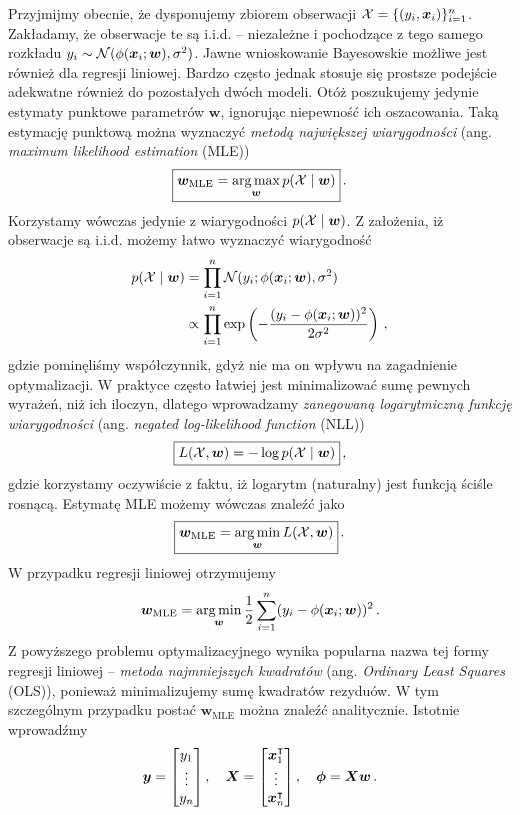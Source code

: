 \documentclass{myclass}
\begin{document}
Przyjmijmy obecnie, że dysponujemy zbiorem obserwacji \(\mathcal{X} = \{(y_i, \bm{x}_i)\}_{i=1}^n\).
Zakładamy, że obserwacje te są i.i.d. -- niezależne i pochodzące z tego samego rozkładu \(y_i \sim
\mathcal{N}(\phi(\bm{x}_i; \bm{w}), \sigma^2)\). Jawne wnioskowanie Bayesowskie możliwe jest również dla
regresji liniowej. Bardzo często jednak stosuje się prostsze podejście adekwatne również do
pozostałych dwóch modeli. Otóż poszukujemy jedynie estymaty punktowe parametrów \(\bm{w}\),
ignorując niepewność ich oszacowania. Taką estymację punktową można wyznaczyć \emph{metodą
największej wiarygodności} (ang. \emph{maximum likelihood estimation} (MLE))
\[
\boxed{
    \bm{w}_\text{MLE} = \operatorname*{arg\,max}_{\bm{w}} p(\mathcal{X} \mid \bm{w})
}\,.
\]
Korzystamy wówczas jedynie z wiarygodności \(p(\mathcal{X} \mid \bm{w})\). Z założenia, iż obserwacje są
i.i.d. możemy łatwo wyznaczyć wiarygodność
\[
\begin{split}
    p(\mathcal{X} \mid \bm{w}) &= \prod_{i=1}^n \mathcal{N}(y_i; \phi(\bm{x}_i; \bm{w}), \sigma^2) \\
                          &\propto \prod_{i=1}^n \exp\left(-\frac{(y_i - \phi(\bm{x}_i; \bm{w}))^2}{2\sigma^2}\right)\,,
\end{split}
\]
gdzie pominęliśmy współczynnik, gdyż nie ma on wpływu na zagadnienie optymalizacji. W praktyce
często łatwiej jest minimalizować sumę pewnych wyrażeń, niż ich iloczyn, dlatego wprowadzamy
\emph{zanegowaną logarytmiczną funkcję wiarygodności} (ang. \emph{negated log-likelihood function}
(NLL))
\[
\boxed{
    L(\mathcal{X}, \bm{w}) = - \log p(\mathcal{X} \mid \bm{w})
}\,,
\]
gdzie korzystamy oczywiście z faktu, iż logarytm (naturalny) jest funkcją ściśle rosnącą. Estymatę
MLE możemy wówczas znaleźć jako
\[
\boxed{
    \bm{w}_\text{MLE} = \operatorname*{arg\,min}_{\bm{w}} L(\mathcal{X}, \bm{w})
}\,.
\]
W przypadku regresji liniowej otrzymujemy
\[
    \bm{w}_\text{MLE} = \operatorname*{arg\,min}_{\bm{w}} \frac{1}{2}\sum_{i=1}^n (y_i - \phi(\bm{x}_i; \bm{w}))^2\,.
\]
Z powyższego problemu optymalizacyjnego wynika popularna nazwa tej formy regresji liniowej --
\emph{metoda najmniejszych kwadratów} (ang. \emph{Ordinary Least Squares} (OLS)), ponieważ
minimalizujemy sumę kwadratów rezyduów. W tym szczególnym przypadku postać \(\bm{w}_\text{MLE}\)
można znaleźć analitycznie. Istotnie wprowadźmy
\[
    \bm{y} = \mqty[y_1 \\ \vdots \\ y_n]\,,\quad \bm{X} = \mqty[\bm{x}_1^\tpose \\ \vdots \\ \bm{x}_n^\tpose]\,,\quad \bm{\phi} = \bm{X}\bm{w}\,.
\]
\end{document}
